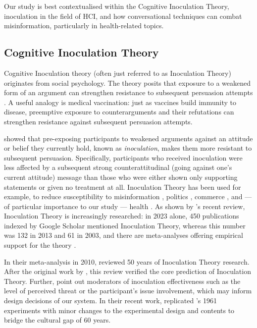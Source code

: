 \documentclass[sigconf]{acmart}
\begin{document}

Our study is best contextualised within the Cognitive Inoculation Theory, inoculation in the field of HCI, and how conversational techniques can combat misinformation, particularly in health-related topics. 

\subsection{Cognitive Inoculation Theory}

Cognitive Inoculation theory (often just referred to as Inoculation Theory) originates from social psychology.
The theory posits that exposure to a weakened form of an argument can strengthen resistance to subsequent persuasion attempts \cite{Compton_2024, McGuire_1961, McGuire_1964}.
A useful analogy is medical vaccination: just as vaccines build immunity to disease, preemptive exposure to counterarguments and their refutations can strengthen resistance against subsequent persuasion attempts.

\citet{McGuire_1961} showed that pre-exposing participants to weakened arguments against an attitude or belief they currently hold, known as \textit{inoculation}, makes them more resistant to subsequent persuasion.
Specifically, participants who received inoculation were less affected by a subsequent strong counterattitudinal (going against one's current attitude) message than those who were either shown only supporting statements or given no treatment at all. Inoculation Theory has been used for example, to reduce susceptibility to misinformation \cite{Roozenbeek_VanDerLinden_Nygren_2020}, politics \cite{Pfau1988INOCULATIONIP}, commerce \cite{inoculation_advertising_2016}, and --- of particular importance to our study --- health \cite{compton2017inoculation, McGuire_1961, pfau1992use}. As shown by \citeauthor{Compton_2024}'s recent review, Inoculation Theory is increasingly researched: in 2023 alone, 450 publications indexed by Google Scholar mentioned Inoculation Theory, whereas this number was 132 in 2013 and 61 in 2003, and there are meta-analyses offering empirical support for the theory \cite{Banas_Rains_2010}. 

In their meta-analysis in 2010, \citet{Banas_Rains_2010} reviewed 50 years of Inoculation Theory research. After the original work \cite{McGuire_1961, McGuire_1964} by \citeauthor{McGuire_1961}, this review verified the core prediction of Inoculation Theory. Further, \citeauthor{Banas_Rains_2010} point out moderators of inoculation effectiveness such as the level of perceived threat or the participant's issue involvement, which may inform design decisions of our system. In their recent work, \citeauthor{Fransen_Mollen_Rains_Das_Vermeulen_2024} replicated \citeauthor{McGuire_1961}'s 1961 experiments with minor changes to the experimental design and contents to bridge the cultural gap of 60 years.
\end{document}
